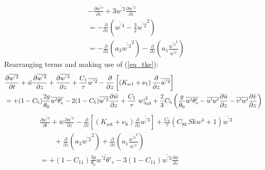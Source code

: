 \documentclass[11pt,fleqn]{article}
\newcommand{\ptlder}[2]{\frac{\partial #1}{\partial #2}}
\begin{document}
%
\begin{equation}
\begin{split}
& - \ptlder{\overline{w^{'4}}}{z} 
  + 3\overline{w^{'2}}\ptlder{\overline{w^{'2}}}{z} \\
& = - \ptlder{}{z}
         \left( \overline{w^{'4}} -\frac{3}{2}\overline{w^{'2}}^2 \right) \\
& = - \ptlder{}{z} 
      \left( a_3 \overline{w^{'2}}^2 \right)
    - \ptlder{}{z} 
      \left( a_1 \frac{ \overline{w^{'3}}^2 }{ \overline{w^{'2}} } \right)
\end{split}
\end{equation}
%
Rearranging terms and making use of (\ref{eq_tke}):
%
\begin{equation}
\label{eq_wp2c}
\begin{split}
& \ptlder{\overline{w^{'2}}}{t} 
  + \bar{w}\ptlder{\overline{w^{'2}}}{z}	 
  + \ptlder{\overline{w^{'3}}}{z} 
  + \dfrac{C_1}{\tau} \overline{w^{'2}} 
  - \ptlder{}{z} \left[ \left( K_{w1} + \nu_1 \right)
                        \ptlder{}{z} \overline{w^{'2}} 
                 \right]  \\
& =
  + ( 1 - C_5 ) \frac{2g}{\theta_0} \overline{w'\theta'_v}
  - 2 ( 1 - C_5 ) \overline{w^{'2}}\ptlder{\bar{w}}{z}
  + \dfrac{C_1}{\tau} \left. w \right|_{\rm{tol}}^{2}
  + \frac{2}{3} C_5
     \left(
       \frac{g}{\theta_0} \overline{w'\theta'_v} 
       - \overline{u'w'}\ptlder{\bar{u}}{z} 
       - \overline{v'w'}\ptlder{\bar{v}}{z} 
     \right) \\
\end{split}
\end{equation}
%
\begin{equation}
\label{eq_wp3c}
\begin{split}
& \ptlder{\overline{w^{'3}}}{t}
   + \bar{w}\ptlder{\overline{w^{'3}}}{z}
   - \ptlder{}{z} \left[ \left( K_{w8} + \nu_8 \right)
                         \ptlder{}{z} \overline{w^{'3}} 
                  \right]
  + \frac{C_8}{\tau}\left( C_{8b} \, Skw^4 + 1 \right) \overline{w^{'3}} \\
& \qquad 
  + \ptlder{}{z} \left( a_3 \overline{w^{'2}}^2 \right)
  + \ptlder{}{z} 
       \left(
          a_1 \frac{ \overline{w^{'3}}^2 }{ \overline{w^{'2}} }
       \right) \\
& = 
  + (1 - C_{11}) \frac{3g}{\theta_0} \overline{w^{'2}\theta'_v}
  - 3 ( 1 - C_{11} ) \overline{w^{'3}}\ptlder{\bar{w}}{z} \\
\end{split}
\end{equation}
%
\end{document}
